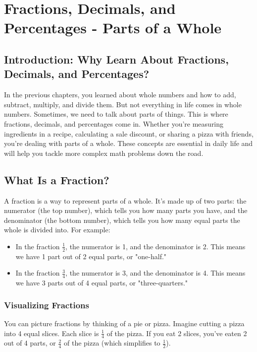 \chapter{Fractions, Decimals, and Percentages - Parts of a Whole}

\section{Introduction: Why Learn About Fractions, Decimals, and Percentages?}
In the previous chapters, you learned about whole numbers and how to add, subtract, multiply, and divide them. But not everything in life comes in whole numbers. Sometimes, we need to talk about parts of things. This is where fractions, decimals, and percentages come in. Whether you’re measuring ingredients in a recipe, calculating a sale discount, or sharing a pizza with friends, you’re dealing with parts of a whole. These concepts are essential in daily life and will help you tackle more complex math problems down the road.

\section{What Is a Fraction?}
A fraction is a way to represent parts of a whole. It’s made up of two parts: the numerator (the top number), which tells you how many parts you have, and the denominator (the bottom number), which tells you how many equal parts the whole is divided into. For example:
\begin{itemize}
    \item In the fraction $\frac{1}{2}$, the numerator is 1, and the denominator is 2. This means we have 1 part out of 2 equal parts, or "one-half."
    \item In the fraction $\frac{3}{4}$, the numerator is 3, and the denominator is 4. This means we have 3 parts out of 4 equal parts, or "three-quarters."
\end{itemize}

\subsection{Visualizing Fractions}
You can picture fractions by thinking of a pie or pizza. Imagine cutting a pizza into 4 equal slices. Each slice is $\frac{1}{4}$ of the pizza. If you eat 2 slices, you’ve eaten 2 out of 4 parts, or $\frac{2}{4}$ of the pizza (which simplifies to $\frac{1}{2}$).

\begin{center}
\end{center}

